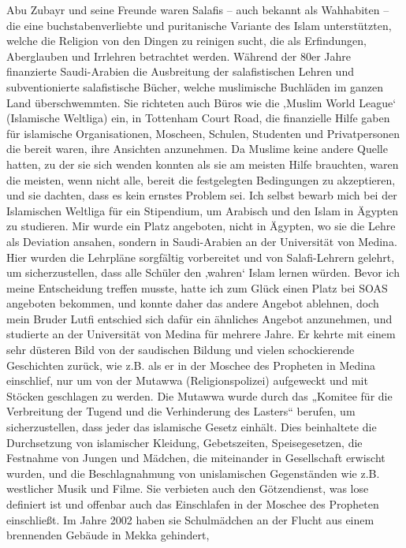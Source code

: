 \documentclass[12pt]{memoir}
\def\–{\hskip0pt-\hskip0pt}
\begin{document}
Abu Zubayr und seine Freunde waren Salafis – auch bekannt als Wahhabiten –
die eine buchstabenverliebte und puritanische
Variante des Islam unterstützten,
welche die Religion von den Dingen zu reinigen sucht,
die als Erfindungen, Aberglauben und Irrlehren betrachtet werden.
Während der 80er Jahre finanzierte Saudi\–Arabien
die Ausbreitung der salafistischen Lehren
und subventionierte salafistische Bücher,
welche muslimische Buchläden im ganzen Land überschwemmten.
Sie richteten auch Büros wie die ‚Muslim World League‘
(Islamische Weltliga) ein,
in Tottenham Court Road,
die finanzielle Hilfe gaben für islamische Organisationen,
Moscheen, Schulen, Studenten und Privatpersonen
die bereit waren, ihre Ansichten anzunehmen.
Da Muslime keine andere Quelle hatten, zu der sie sich wenden konnten
als sie am meisten Hilfe brauchten,
waren die meisten, wenn nicht alle,
bereit die festgelegten Bedingungen zu akzeptieren,
und sie dachten, dass es kein ernstes Problem sei.
Ich selbst bewarb mich bei der Islamischen Weltliga
für ein Stipendium, um Arabisch und den Islam in Ägypten zu studieren.
Mir wurde ein Platz angeboten,
nicht in Ägypten, wo sie die Lehre als Deviation ansahen,
sondern in Saudi\–Arabien an der Universität von Medina.
Hier wurden die Lehrpläne sorgfältig vorbereitet
und von Salafi\–Lehrern gelehrt,
um sicherzustellen, dass alle Schüler den ‚wahren‘ Islam lernen würden.
Bevor ich meine Entscheidung treffen musste,
hatte ich zum Glück einen Platz bei SOAS angeboten bekommen,
und konnte daher das andere Angebot ablehnen,
doch mein Bruder Lutfi entschied sich dafür ein ähnliches Angebot anzunehmen,
und studierte an der Universität von Medina für mehrere Jahre.
Er kehrte mit einem sehr düsteren Bild von der saudischen Bildung
und vielen schockierende Geschichten zurück,
wie z.B. als er in der Moschee des Propheten in Medina einschlief,
nur um von der Mutawwa (Religionspolizei)
aufgeweckt und mit Stöcken geschlagen zu werden.
Die Mutawwa wurde durch das „Komitee für die Verbreitung der Tugend
und die Verhinderung des Lasters“ berufen, um sicherzustellen,
dass jeder das islamische Gesetz einhält.
Dies beinhaltete die Durchsetzung von islamischer Kleidung,
Gebetszeiten, Speisegesetzen,
die Festnahme von Jungen und Mädchen,
die miteinander in Gesellschaft erwischt wurden,
und die Beschlagnahmung von unislamischen Gegenständen
wie z.B. westlicher Musik und Filme.
Sie verbieten auch den Götzendienst,
was lose definiert ist und offenbar auch
das Einschlafen in der Moschee des Propheten einschließt.
Im Jahre 2002 haben sie Schulmädchen an der Flucht
aus einem brennenden Gebäude in Mekka gehindert,
\end{document}
